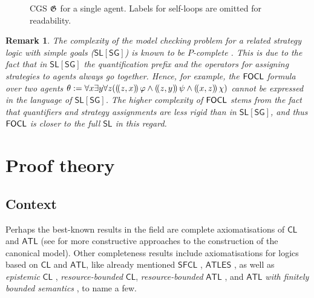 \documentclass[sigconf,anonymous]{aamas}
\newtheorem{remark}{Remark}
\begin{document}
\begin{figure}[h!]
\centering
{}
\caption{CGS $\mathfrak{G}$ for a single agent. Labels for self-loops are omitted for readability.}
\label{fig::hardness}
\end{figure} 

\begin{remark}
    The complexity of the model checking problem for a related \textit{strategy logic with simple goals} ($\mathsf{SL[SG]}$) is known to be $P$-complete \cite{belardinelli19}. 
This is due to the fact that in $\mathsf{SL[SG]}$ the quantification prefix and the operators for assigning strategies to agents always go together. Hence, for example, the $\mathsf{FOCL}$ formula over two agents $\theta:=\forall x \exists y \forall z ((\!( z,x )\!)\, \varphi \land (\!( z,y )\!)\, \psi \land (\!( x,z )\!)\,\chi)$ cannot be expressed in the language of $\mathsf{SL[SG]}$. The higher complexity of $\mathsf{FOCL}$ stems from the fact that quantifiers and strategy assignments are less rigid than in $\mathsf{SL[SG]}$, and thus $\mathsf{FOCL}$ is closer to the full $\mathsf{SL}$ in this regard. 
\end{remark}




\section{Proof theory}
\label{sec:axiom}

\subsection{Context}
Perhaps the best-known results in the field are complete axiomatisations of $\mathsf{CL}$ \cite{pauly02,goranko13} and $\mathsf{ATL}$ \cite{goranko06} (see \cite{walther06,goranko09} for more constructive approaches to the construction of the canonical model). Other completeness results include axiomatisations for logics based on $\mathsf{CL}$ and $\mathsf{ATL}$, like already mentioned $\mathsf{SFCL}$ \cite{goranko18}, $\mathsf{ATLES}$ \cite{walther07}, as well as \textit{epistemic} $\mathsf{CL}$ \cite{agotnes19}, \textit{resource-bounded} $\mathsf{CL}$\cite{alechina11}, \textit{resource-bounded} $\mathsf{ATL}$ \cite{nguyen18}, and $\mathsf{ATL}$ \textit{with finitely bounded semantics} \cite{goranko19}, to name a few.
\end{document}
